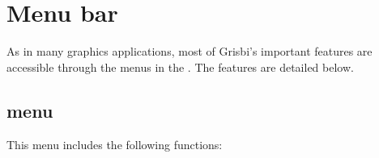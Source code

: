 
\newpage
\section{Menu bar\label{home-menus}}

As in many graphics applications, most of Grisbi's important features are accessible through the menus in the . The features are detailed below.


\subsection{ menu\label{home-menus-file}}

This menu includes the following functions:

